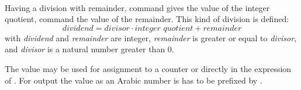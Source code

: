 \begin{Declaration}
  \\
\end{Declaration}%
%
%
Having a division with remainder, command
 gives the value of the integer quotient, command 
the value of the remainder. This kind of division is defined:
\[
\textit{dividend} = \textit{divisor} \cdot
\textit{integer quotient} + \textit{remainder}
\]
with \textit{dividend} and \textit{remainder} are integer, \textit{remainder}
is greater or equal to \textit{divisor}, and \textit{divisor} is a natural
number greater than 0.

The value may be used for assignment to a counter or directly in the
expression of . For output the value as an Arabic number is has
to be prefixed by .%
%
%
%
%
%

\endinput


